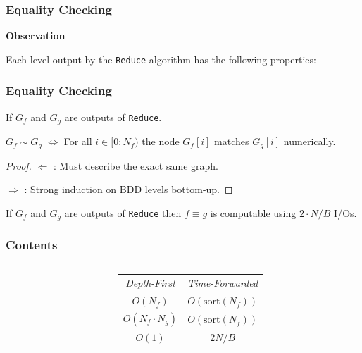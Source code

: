 \documentclass[english, aspectratio=169]{beamer}
\newcommand{\sort}[0]{\text{sort}}
\begin{document}
\begin{frame}
  \frametitle{Equality Checking}

  

  {\bf Observation}

  \vspace{-10pt}
  Each level output by the \texttt{Reduce} algorithm has the following properties:
  \begin{itemize}
  \end{itemize}
\end{frame}

\begin{frame}
  \frametitle{Equality Checking}

  \begin{theorem}
    If $G_f$ and $G_g$ are outputs of \lstinline{Reduce}.
    \begin{center}
      $G_f \sim G_g$ $\iff$ For all $i \in [0; N_f)$ the node $G_f[i]$ matches
      $G_g[i]$ numerically.
    \end{center}
  \end{theorem}
  \begin{proof}
    $\Leftarrow$ : Must describe the exact same graph.

    $\Rightarrow$ : Strong induction on BDD levels bottom-up.
  \end{proof}

  \pause
  \begin{corollary}
    If $G_f$ and $G_g$ are outputs of \lstinline{Reduce} then $f \equiv g$ is
    computable using $2 \cdot N/B$ I/Os.
  \end{corollary}
\end{frame}

\begin{frame}{}
  \frametitle{Contents}
  \begin{columns}
    \begin{column}{0.42\linewidth}
      \tableofcontents
    \end{column}
    \begin{column}{0.57\linewidth}
      \vspace{32pt}
      \begin{table}
        \centering
        \begin{tabular}{cc}
          \emph{Depth-First} & \emph{Time-Forwarded}
          \\
          $O(N_f)$           & $O(\sort(N_f))$
          \\
          $O(N_f \cdot N_g)$ & $O(\sort(N_f))$
          \\
          $O(1)$             & $2N / B$
        \end{tabular}
      \end{table}
    \end{column}
  \end{columns}
\end{frame}
\end{document}
